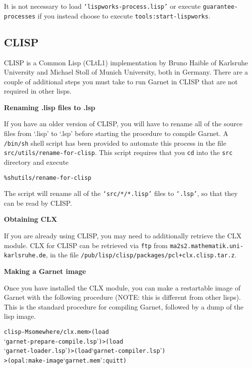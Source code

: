\documentclass{report}
\newenvironment{programexample}{\begin{alltt}}{\end{alltt}}
\begin{document}
It is not necessary to load \texttt{`lispworks-process.lisp'} or execute
\texttt{guarantee-processes} if you instead choose to execute
\texttt{tools:start-lispworks}.



\subsection{CLISP}
\label{clisp}

CLISP is a Common Lisp (CLtL1) implementation by Bruno Haible of
Karlsruhe University and Michael Stoll of Munich University, both in
Germany.  There are a couple of additional steps you must take to run
Garnet in CLISP that are not required in other lisps.


{\bf Renaming .lisp files to .lsp}

If you have an older version of CLISP, you will have to rename all of
the source files from `.lisp' to `.lsp' before starting the procedure
to compile Garnet.  A \texttt{/bin/sh} shell script has been provided to
automate this process in the file \texttt{src/utils/rename-for-clisp}.
This script requires that you \texttt{cd} into the \texttt{src} directory and
execute

\begin{alltt}
\% sh utils/rename-for-clisp
\end{alltt}

The script will rename all of the \texttt{`src/*/*.lisp'} files to
\texttt{`.lsp'}, so that they can be read by CLISP.


{\bf Obtaining CLX}

If you are already using CLISP, you may need to additionally retrieve
the CLX module.  CLX for CLISP can be retrieved via \texttt{ftp} from
\texttt{ma2s2.mathematik.uni-karlsruhe.de}, in the file
\texttt{/pub/lisp/clisp/packages/pcl+clx.clisp.tar.z}.


{\bf Making a Garnet image}

Once you have installed the CLX module, you can make a restartable
image of Garnet with the following procedure (NOTE: this is different
from other lisps).  This is the standard procedure for compiling
Garnet, followed by a dump of the lisp image.

\begin{programexample}
  clisp -M somewhere/clx.mem > (load
  `garnet-prepare-compile.lsp') > (load
  `garnet-loader.lsp') > (load `garnet-compiler.lsp')
  > (opal:make-image `garnet.mem' :quit t)
\end{programexample}
\end{document}
